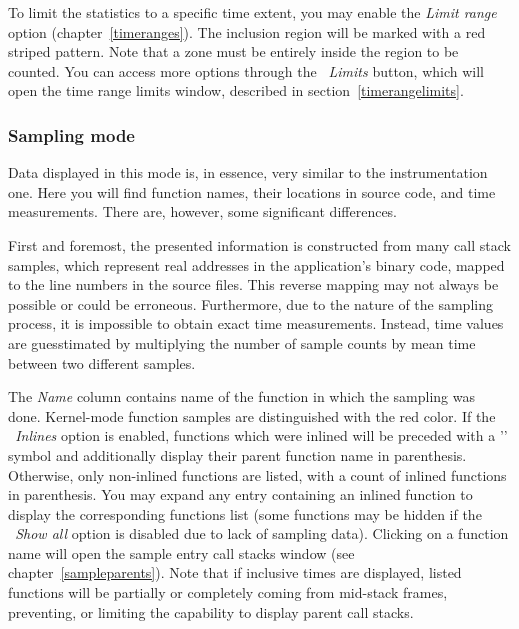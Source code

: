 \documentclass[hidelinks,titlepage,a4paper]{article}
\begin{document}
To limit the statistics to a specific time extent, you may enable the \emph{Limit range} option (chapter~\ref{timeranges}). The inclusion region will be marked with a red striped pattern. Note that a zone must be entirely inside the region to be counted. You can access more options through the \emph{\faRuler{}~Limits} button, which will open the time range limits window, described in section~\ref{timerangelimits}.

\subsubsection{Sampling mode}
\label{statisticssampling}

Data displayed in this mode is, in essence, very similar to the instrumentation one. Here you will find function names, their locations in source code, and time measurements. There are, however, some significant differences.

First and foremost, the presented information is constructed from many call stack samples, which represent real addresses in the application's binary code, mapped to the line numbers in the source files. This reverse mapping may not always be possible or could be erroneous. Furthermore, due to the nature of the sampling process, it is impossible to obtain exact time measurements. Instead, time values are guesstimated by multiplying the number of sample counts by mean time between two different samples.

The \emph{Name} column contains name of the function in which the sampling was done. Kernel-mode function samples are distinguished with the red color. If the \emph{\faSitemap{}~Inlines} option is enabled, functions which were inlined will be preceded with a '\faCaretRight{}' symbol and additionally display their parent function name in parenthesis. Otherwise, only non-inlined functions are listed, with a count of inlined functions in parenthesis. You may expand any entry containing an inlined function to display the corresponding functions list (some functions may be hidden if the \emph{\faPuzzlePiece{}~Show all} option is disabled due to lack of sampling data). Clicking on a function name will open the sample entry call stacks window (see chapter~\ref{sampleparents}). Note that if inclusive times are displayed, listed functions will be partially or completely coming from mid-stack frames, preventing, or limiting the capability to display parent call stacks.
\end{document}
